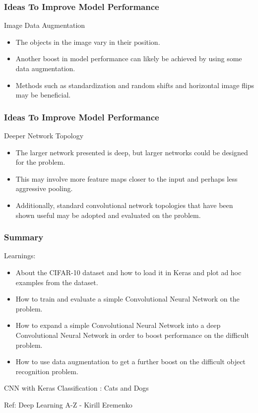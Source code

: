 \begin{frame}[fragile] \frametitle{Ideas To Improve Model Performance}
Image Data Augmentation
\begin{itemize}
\item The objects in the image vary in their position. 
\item Another boost in model performance can likely be achieved by using some data augmentation.
\item Methods such as standardization and random shifts and horizontal image flips may be beneficial.
\end{itemize}
\end{frame}

\begin{frame}[fragile] \frametitle{Ideas To Improve Model Performance}
Deeper Network Topology
\begin{itemize}
\item The larger network presented is deep, but larger networks could be designed for the problem. 
\item This may involve more feature maps closer to the input and perhaps less aggressive pooling. 
\item Additionally, standard convolutional network topologies that have been shown useful may be adopted and evaluated on the problem.
\end{itemize}
\end{frame}

\begin{frame}[fragile] \frametitle{Summary}
Learnings:
\begin{itemize}
\item About the CIFAR-10 dataset and how to load it in Keras and plot ad hoc examples from the dataset.
\item How to train and evaluate a simple Convolutional Neural Network on the problem.
\item How to expand a simple Convolutional Neural Network into a deep Convolutional Neural Network in order to boost performance on the difficult problem.
\item How to use data augmentation to get a further boost on the difficult object recognition problem.
\end{itemize}
\end{frame}

\begin{frame}
  \begin{center}
    {\Large CNN with Keras Classification : Cats and Dogs}
    
    {Ref: Deep Learning A-Z - Kirill Eremenko}
  \end{center}
\end{frame}

